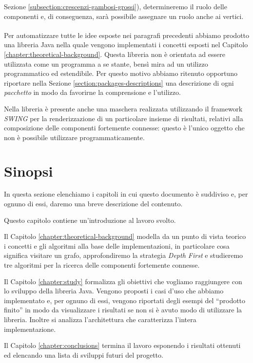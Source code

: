 Sezione \ref{subsection:crescenzi-gambosi-grossi}), determineremo il
ruolo delle componenti e, di conseguenza, sar\`a possibile assegnare
un ruolo anche ai vertici.
\\\\
Per automatizzare tutte le idee esposte nei paragrafi precedenti
abbiamo prodotto una libreria Java nella quale vengono implementati i
concetti esposti nel Capitolo
\ref{chapter:theoretical-background}. Questa libreria non \`e
orientata ad essere utilizzata come un programma a se stante, bens\`i
mira ad un utilizzo programmatico ed estendibile. Per questo motivo
abbiamo ritenuto opportuno riportare nella Sezione
\ref{section:packages-descriptions} una descrizione di ogni
\emph{pacchetto} in modo da favorirne la comprensione e l'utilizzo.

Nella libreria \`e presente anche una maschera realizzata utilizzando
il framework \emph{SWING} per la renderizzazione di un particolare
insieme di risultati, relativi alla composizione delle componenti
fortemente connesse: questo \`e l'unico oggetto che non \`e possibile
utilizzare programmaticamente.

\section{Sinopsi}
In questa sezione elenchiamo i capitoli in cui questo documento \`e
suddiviso e, per ognuno di essi, daremo una breve descrizione del
contenuto.

Questo capitolo contiene un'introduzione al lavoro svolto.

Il Capitolo \ref{chapter:theoretical-background} modella da un punto
di vista teorico i concetti e gli algoritmi alla base delle
implementazioni, in particolare cosa significa visitare un grafo,
approfondiremo la strategia \emph{Depth First} e studieremo tre
algoritmi per la ricerca delle componenti fortemente connesse.

Il Capitolo \ref{chapter:study} formalizza gli obiettivi che vogliamo
raggiungere con lo sviluppo della libreria Java. Vengono proposti i
casi d'uso che abbiamo implementato e, per ognuno di essi, vengono
riportati degli esempi del ``prodotto finito'' in modo da visualizzare
i risultati se non si \`e avuto modo di utilizzare la
libreria. Inoltre si analizza l'architettura che caratterizza l'intera
implementazione.

Il Capitolo \ref{chapter:conclusions} termina il lavoro esponendo i
risultati ottenuti ed elencando una lista di sviluppi futuri del
progetto.

